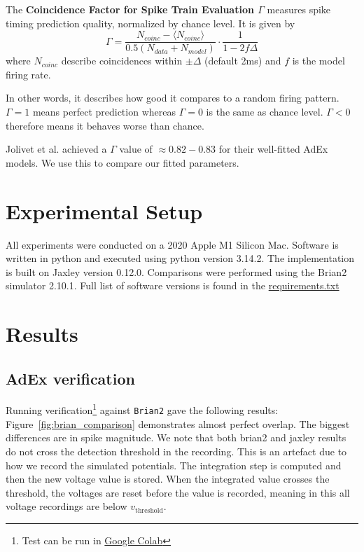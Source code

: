 \documentclass[conference]{IEEEtran}
\begin{document}
The \textbf{Coincidence Factor for Spike Train Evaluation $\Gamma$} measures spike timing prediction quality, normalized by chance level.
It is given by
\begin{equation}
   \Gamma = \frac{N_{coinc} - \langle N_{coinc} \rangle}{0.5(N_{data} + N_{model})} \cdot \frac{1}{1 - 2f\Delta}
  \label{eq:coincidence-factor}
\end{equation}
where $N_{coinc}$ describe coincidences within $\pm\Delta$ (default 2ms)
and $f$ is the model firing rate.

In other words, it describes how good it compares to a random firing pattern. $\Gamma = 1$ means perfect prediction whereas $\Gamma = 0$ is the same as chance level.
$\Gamma < 0$ therefore means it behaves worse than chance.

Jolivet et al. achieved a $\Gamma$ value of $\approx 0.82-0.83$ for their well-fitted AdEx models.
We use this to compare our fitted parameters.

\section{Experimental Setup}\label{sec:expsetup}
All experiments were conducted on a 2020 Apple M1 Silicon Mac.
Software is written in python and executed using python version 3.14.2.
The implementation is built on Jaxley version 0.12.0.
Comparisons were performed using the Brian2 simulator 2.10.1.
Full list of software versions is found in the \href{https://github.com/paulmyr/DD2375-HT25-Project-Course-in-High-Performance-Computing/blob/master/requirements.txt}{requirements.txt}

\section{Results}\label{sec:results}
\subsection{AdEx verification}
Running verification\footnote{Test can be run in \href{https://colab.research.google.com/github/paulmyr/DD2375-HT25-Project-Course-in-High-Performance-Computing/blob/master/5_evaluation/notebooks/jaxley_test_adex.ipynb}{Google Colab}} against \texttt{Brian2} gave the following results:
Figure~\ref{fig:brian_comparison} demonstrates almost perfect overlap.
The biggest differences are in spike magnitude.
We note that both brian2 and jaxley results do not cross the detection threshold in the recording.
This is an artefact due to how we record the simulated potentials.
The integration step is computed and then the new voltage value is stored.
When the integrated value crosses the threshold, the voltages are reset before the value is recorded, meaning in this all voltage recordings are below $v_{\text{threshold}}$.
\end{document}
